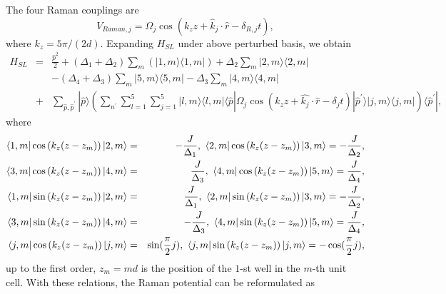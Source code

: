 \documentclass[twocolumn,prl,floatfix,citeautoscript,nofootinbib]{revtex4}
\begin{document}
The four Raman couplings are
\begin{equation}
V_{Raman,j}=\Omega _{j}\cos \left( k_{z}z+\hat{k}_{j}\cdot \hat{r}-\delta
_{R,j}t\right) ,
\end{equation}%
where $k_{z}=5\pi /(2d)$. Expanding $H_{SL}$ under above perturbed basis, we
obtain
\begin{eqnarray}
H_{SL} &=&\frac{\hat{p}^{2}}{2}+\left( \Delta _{1}+\Delta _{2}\right)
\sum_{m}\left( |1,m\rangle \langle 1,m|\right) +\Delta
_{2}\sum_{m}|2,m\rangle \langle 2,m| \\
&&-\left( \Delta _{4}+\Delta _{3}\right) \sum_{m}|5,m\rangle \langle
5,m|-\Delta _{3}\sum_{m}|4,m\rangle \langle 4,m|  \nonumber \\
&+&\sum_{\hat{p},\hat{p}^{\prime }}|\hat{p}\rangle \left( \sum_{n^{\prime
}}\sum_{l=1}^{5}\sum_{j=1}^{5}|l,m\rangle \langle l,m|\langle \hat{p}|\Omega
_{j}\cos \left( k_{z}z+\hat{k_{j}}\cdot \hat{r}-\delta _{j}t\right) |\hat{p}%
^{\prime }\rangle |j,m\rangle \langle j,m|\right) \langle \hat{p}^{\prime }|,
\nonumber
\end{eqnarray}%
where
\begin{eqnarray}
\langle 1,m|\cos \left( k_{z}(z-z_{m})\right) |2,m\rangle &=&-\frac{J}{%
\Delta _{1}},~\langle 2,m|\cos \left( k_{z}(z-z_{m})\right) |3,m\rangle =-%
\frac{J}{\Delta _{2}}, \\
\langle 3,m|\cos \left( k_{z}(z-z_{m})\right) |4,m\rangle &=&\frac{J}{\Delta
_{3}},~\langle 4,m|\cos \left( k_{z}(z-z_{m})\right) |5,m\rangle =\frac{J}{%
\Delta _{4}},  \nonumber \\
\langle 1,m|\sin \left( k_{z}(z-z_{m})\right) |2,m\rangle &=&\frac{J}{\Delta
_{1}},~\langle 2,m|\sin \left( k_{z}(z-z_{m})\right) |3,m\rangle =-\frac{J}{%
\Delta _{2}},  \nonumber \\
\langle 3,m|\sin \left( k_{z}(z-z_{m})\right) |4,m\rangle &=&-\frac{J}{%
\Delta _{3}},~\langle 4,m|\sin \left( k_{z}(z-z_{m})\right) |5,m\rangle =%
\frac{J}{\Delta _{4}},  \nonumber \\
\langle j,m|\cos \left( k_{z}(z-z_{m})\right) |j,m\rangle &=&\sin (\frac{\pi
}{2}j),~\langle j,m|\sin \left( k_{z}(z-z_{m})\right) |j,m\rangle =-\cos (%
\frac{\pi }{2}j),  \nonumber
\end{eqnarray}%
up to the first order, $z_{m}=md$ is the position of the $1$-st well in the $%
m$-th unit cell. With these relations, the Raman potential can be
reformulated as
\end{document}

